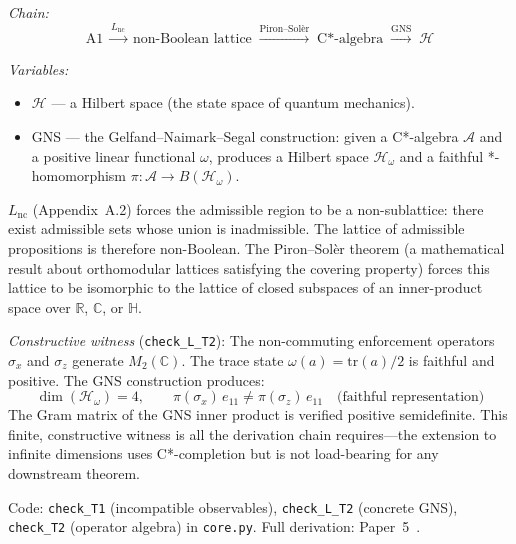 \documentclass[11pt]{article}
\newcommand{\Lnc}{L_{\mathrm{nc}}}
\newcommand{\tr}{\mathrm{tr}}
\begin{document}
\begin{tcolorbox}[apfbox, title={T2: Operator Algebra $\to$ Hilbert Space}]
\textit{Chain:}
\begin{equation}
\text{A1} \;\xrightarrow{\Lnc}\; \text{non-Boolean lattice} \;\xrightarrow{\text{Piron--Sol\`er}}\; \text{C*-algebra} \;\xrightarrow{\text{GNS}}\; \mathcal{H}
\end{equation}

\smallskip\noindent\textit{Variables:}
\begin{itemize}[nosep,leftmargin=2em]
\item $\mathcal{H}$ --- a Hilbert space (the state space of quantum mechanics).
\item GNS --- the Gelfand--Naimark--Segal construction: given a C*-algebra $\mathcal{A}$ and a positive linear functional $\omega$, produces a Hilbert space $\mathcal{H}_\omega$ and a faithful *-homomorphism $\pi : \mathcal{A} \to B(\mathcal{H}_\omega)$.
\end{itemize}
\end{tcolorbox}

$\Lnc$ (Appendix~A.2) forces the admissible region to be a non-sublattice: there exist admissible sets whose union is inadmissible.  The lattice of admissible propositions is therefore non-Boolean.  The Piron--Sol\`er theorem (a mathematical result about orthomodular lattices satisfying the covering property) forces this lattice to be isomorphic to the lattice of closed subspaces of an inner-product space over $\mathbb{R}$, $\mathbb{C}$, or $\mathbb{H}$.

\textit{Constructive witness} (\texttt{check\_L\_T2}):  The non-commuting enforcement operators $\sigma_x$ and $\sigma_z$ generate $M_2(\mathbb{C})$.  The trace state $\omega(a) = \tr(a)/2$ is faithful and positive.  The GNS construction produces:
\begin{equation}
\dim(\mathcal{H}_\omega) = 4, \qquad \pi(\sigma_x)\,e_{11} \ne \pi(\sigma_z)\,e_{11} \quad\text{(faithful representation)}
\end{equation}
The Gram matrix of the GNS inner product is verified positive semidefinite.  This finite, constructive witness is all the derivation chain requires---the extension to infinite dimensions uses C*-completion but is not load-bearing for any downstream theorem.

Code: \texttt{check\_T1} (incompatible observables), \texttt{check\_L\_T2} (concrete GNS), \texttt{check\_T2} (operator algebra) in \texttt{core.py}.  Full derivation: Paper~5~\cite{P5}.
\end{document}
